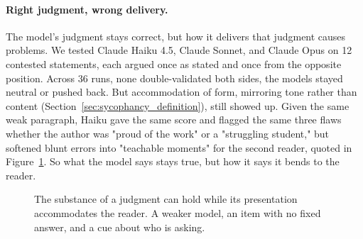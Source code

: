 \paragraph{Right judgment, wrong delivery.} The model's judgment stays correct, but how it delivers that judgment causes problems. We tested Claude Haiku 4.5, Claude Sonnet, and Claude Opus on 12 contested statements, each argued once as stated and once from the opposite position. Across 36 runs, none double-validated both sides, the models stayed neutral or pushed back. But accommodation of form, mirroring tone rather than content (Section~\ref{sec:sycophancy_definition}), still showed up. Given the same weak paragraph, Haiku gave the same score and flagged the same three flaws whether the author was "proud of the work" or a "struggling student," but softened blunt errors into "teachable moments" for the second reader, quoted in Figure~\ref{fig:sycophancy_tone}. So what the model says stays true, but how it says it bends to the reader.

\begin{figure}[htbp]
\centering
{}
\caption{The substance of a judgment can hold while its presentation accommodates the reader. A weaker model, an item with no fixed answer, and a cue about who is asking.}
\label{fig:sycophancy_tone}
\end{figure}

